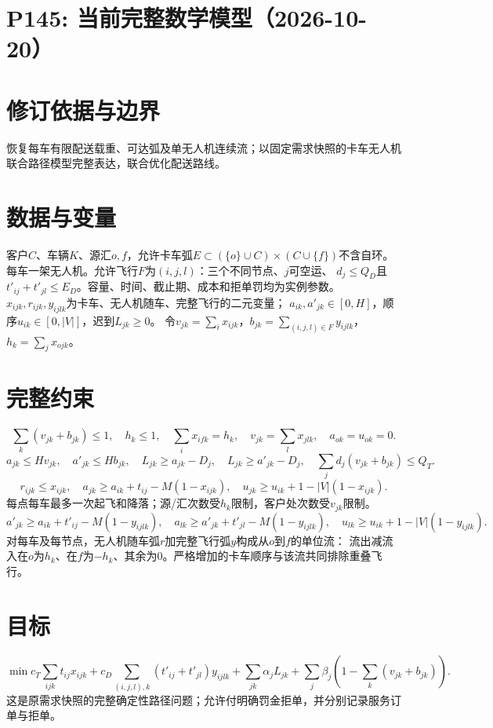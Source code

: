\documentclass[11pt]{ctexart}
\begin{document}
\section*{P145: 当前完整数学模型（2026-10-20）}
\section*{修订依据与边界}恢复每车有限配送载重、可达弧及单无人机连续流；以固定需求快照的卡车无人机联合路径模型完整表达，联合优化配送路线。

\section*{数据与变量}
客户$C$、车辆$K$、源汇$o,f$，允许卡车弧$E\subset(\{o\}\cup C)\times(C\cup\{f\})$不含自环。
每车一架无人机。允许飞行$F$为$(i,j,l)$：三个不同节点、$j$可空运、
$d_j\le Q_D$且$t'_{ij}+t'_{jl}\le E_D$。容量、时间、截止期、成本和拒单罚均为实例参数。
$x_{ijk},r_{ijk},y_{ijlk}$为卡车、无人机随车、完整飞行的二元变量；
$a_{ik},a'_{jk}\in[0,H]$，顺序$u_{ik}\in[0,|V|]$，迟到$L_{jk}\ge0$。
令$v_{jk}=\sum_i x_{ijk}$，$b_{jk}=\sum_{(i,j,l)\in F}y_{ijlk}$，
$h_k=\sum_jx_{ojk}$。
\section*{完整约束}
\[
\sum_k(v_{jk}+b_{jk})\le1,\quad h_k\le1,\quad
\sum_ix_{ifk}=h_k,\quad v_{jk}=\sum_lx_{jlk},\quad a_{ok}=u_{ok}=0.
\]
\[
a_{jk}\le Hv_{jk},\quad a'_{jk}\le Hb_{jk},\quad
L_{jk}\ge a_{jk}-D_j,\quad L_{jk}\ge a'_{jk}-D_j,\quad
\sum_jd_j(v_{jk}+b_{jk})\le Q_T.
\]
\[
r_{ijk}\le x_{ijk},\quad
a_{jk}\ge a_{ik}+t_{ij}-M(1-x_{ijk}),\quad
u_{jk}\ge u_{ik}+1-|V|(1-x_{ijk}).
\]
每点每车最多一次起飞和降落；源/汇次数受$h_k$限制，客户处次数受$v_{jk}$限制。
\[
a'_{jk}\ge a_{ik}+t'_{ij}-M(1-y_{ijlk}),\quad
a_{lk}\ge a'_{jk}+t'_{jl}-M(1-y_{ijlk}),\quad
u_{lk}\ge u_{ik}+1-|V|(1-y_{ijlk}).
\]
对每车及每节点，无人机随车弧$r$加完整飞行弧$y$构成从$o$到$f$的单位流：
流出减流入在$o$为$h_k$、在$f$为$-h_k$、其余为0。严格增加的卡车顺序与该流共同排除重叠飞行。
\section*{目标}
\[
\min c_T\sum_{ijk}t_{ij}x_{ijk}
+c_D\sum_{(i,j,l),k}(t'_{ij}+t'_{jl})y_{ijlk}
+\sum_{jk}\alpha_jL_{jk}
+\sum_j\beta_j(1-\sum_k(v_{jk}+b_{jk})).
\]
这是原需求快照的完整确定性路径问题；允许付明确罚金拒单，并分别记录服务订单与拒单。
\end{document}
